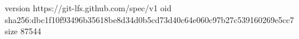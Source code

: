 version https://git-lfs.github.com/spec/v1
oid sha256:dbc1f10f93496b35618be8d34d0b5cd73d40c64e060c97b27c539160269e5cc7
size 87544
